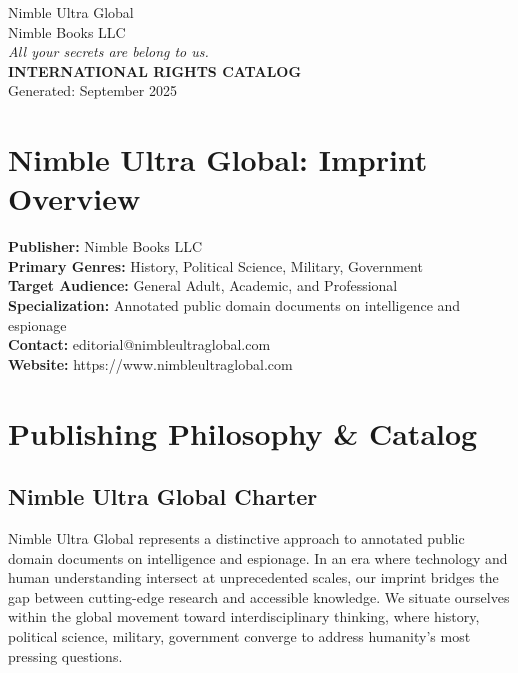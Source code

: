 \documentclass[11pt]{article}
\begin{document}
\thispagestyle{firstpage}

\begin{center}
{\Huge \textcolor{primarycolor}{Nimble Ultra Global}}\\[0.3cm]
{\Large \textcolor{secondarycolor}{Nimble Books LLC}}\\[0.2cm]
{\large \textit{All your secrets are belong to us.}}\\[0.5cm]
{\large \textbf{INTERNATIONAL RIGHTS CATALOG}}\\[0.3cm]
{\normalsize Generated: September 2025}
\end{center}

\vspace{1cm}

\section{Nimble Ultra Global: Imprint Overview}

\textbf{Publisher:} Nimble Books LLC\\
\textbf{Primary Genres:} History, Political Science, Military, Government\\
\textbf{Target Audience:} General Adult, Academic, and Professional\\
\textbf{Specialization:} Annotated public domain documents on intelligence and espionage\\
\textbf{Contact:} editorial@nimbleultraglobal.com\\
\textbf{Website:} https://www.nimbleultraglobal.com\\

\vspace{1cm}

\section{Publishing Philosophy \& Catalog}

\subsection{Nimble Ultra Global Charter}

Nimble Ultra Global represents a distinctive approach to annotated public domain documents on intelligence and espionage. In an era where technology and human understanding intersect at unprecedented scales, our imprint bridges the gap between cutting-edge research and accessible knowledge. We situate ourselves within the global movement toward interdisciplinary thinking, where history, political science, military, government converge to address humanity's most pressing questions.
\end{document}

